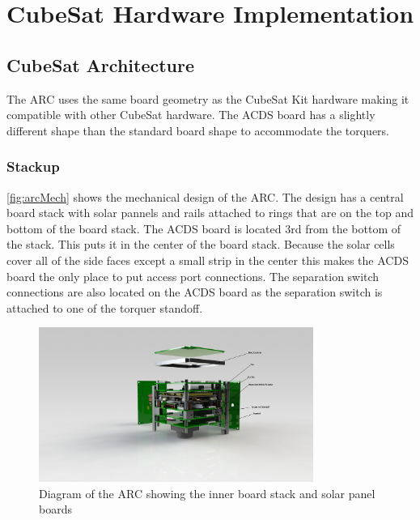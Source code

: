 
\chapter{CubeSat Hardware Implementation}

\label{ch:CubeSatHardware}

\section{CubeSat Architecture}

The \ac{ARC} uses the same board geometry as the CubeSat Kit\cite{CSK} hardware making it compatible with other CubeSat hardware. The \ac{ACDS} board has a slightly different shape than the standard board shape to accommodate the torquers.

\subsection{Stackup}

\autoref{fig:arcMech} shows the mechanical design of the \ac{ARC}. The design has a central board stack with solar pannels and rails attached to rings that are on the top and bottom of the board stack. The \ac{ACDS} board is located 3rd from the bottom of the stack. This puts it in the center of the board stack. Because the solar cells cover all of the side faces except a small strip in the center this makes the \ac{ACDS} board the only place to put access port connections. The separation switch connections are also located on the \ac{ACDS} board as the separation switch is attached to one of the torquer standoff.

\begin{figure}[H]
    \centering
    \includegraphics[width=0.8\textwidth]{Figures/CubeSat-Diagram}
    \caption{Diagram of the \ac{ARC} showing the inner board stack and solar panel boards}
    \label{fig:arcMech}
\end{figure}


